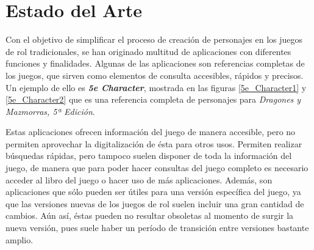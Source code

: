 

\section{Estado del Arte} \label{Estado_Arte}
Con el objetivo de simplificar el proceso de creación de personajes en los juegos de rol tradicionales, se han originado 
multitud de aplicaciones con diferentes funciones y finalidades. Algunas de las aplicaciones son referencias completas de 
los juegos, que sirven como elementos de consulta accesibles, rápidos y precisos. Un ejemplo de ello es 
\textit{\textbf{5e Character}}, mostrada en las figuras \ref*{5e_Character1} y \ref*{5e_Character2} que es una referencia 
completa de personajes para \textit{Dragones y Mazmorras, 5ª Edición}.\medskip

Estas aplicaciones ofrecen información del juego de manera accesible, pero no permiten aprovechar la 
digitalización de ésta para otros usos. Permiten realizar búsquedas rápidas, pero tampoco suelen disponer de 
toda la información del juego, de manera que para poder hacer consultas del juego completo es necesario 
acceder al libro del juego o hacer uso de más aplicaciones. Además, son aplicaciones que sólo pueden 
ser útiles para una versión específica del juego, ya que las versiones nuevas de los juegos de rol suelen 
incluir una gran cantidad de cambios. Aún así, éstas pueden no resultar obsoletas al momento de surgir la 
nueva versión, pues suele haber un período de transición entre versiones bastante amplio.
\newpage

